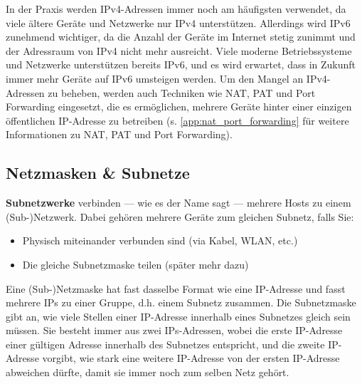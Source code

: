 \begin{myremark}
	In der Praxis werden \gls{IP}v4-Adressen immer noch am häufigsten verwendet, da viele ältere Geräte und Netzwerke nur \gls{IP}v4 unterstützen. Allerdings wird \gls{IP}v6 zunehmend wichtiger, da die Anzahl der Geräte im Internet stetig zunimmt und der Adressraum von \gls{IP}v4 nicht mehr ausreicht. Viele moderne Betriebssysteme und Netzwerke unterstützen bereits \gls{IP}v6, und es wird erwartet, dass in Zukunft immer mehr Geräte auf \gls{IP}v6 umsteigen werden. Um den Mangel an \gls{IP}v4-Adressen zu beheben, werden auch Techniken wie \acrfull{NAT}, \acrfull{PAT} und Port Forwarding eingesetzt, die es ermöglichen, mehrere Geräte hinter einer einzigen öffentlichen \gls{IP}-Adresse zu betreiben (s. \cref{app:nat_port_forwarding} für weitere Informationen zu \acrshort{NAT}, \acrshort{PAT} und Port Forwarding).
\end{myremark}

\subsection{Netzmasken \& Subnetze}
\textbf{Subnetzwerke} verbinden --- wie es der Name sagt --- mehrere Hosts zu einem (Sub-)Netzwerk. Dabei gehören mehrere Geräte zum gleichen Subnetz, falls Sie:
\begin{itemize}
	\item Physisch miteinander verbunden sind (via Kabel, \gls{WLAN}, etc.)
	\item Die gleiche Subnetzmaske teilen (später mehr dazu)
\end{itemize}

Eine (Sub-)Netzmaske hat fast dasselbe Format wie eine \gls{IP}-Adresse und fasst mehrere \glspl{IP} zu einer Gruppe, d.h. einem Subnetz zusammen. Die Subnetzmaske gibt an, wie viele Stellen einer \gls{IP}-Adresse innerhalb eines Subnetzes gleich sein müssen. Sie besteht immer aus zwei \glspl{IP}-Adressen, wobei die erste \gls{IP}-Adresse einer gültigen Adresse innerhalb des Subnetzes entspricht, und die zweite \gls{IP}-Adresse vorgibt, wie stark eine weitere \gls{IP}-Adresse von der ersten \gls{IP}-Adresse abweichen dürfte, damit sie immer noch zum selben Netz gehört.

